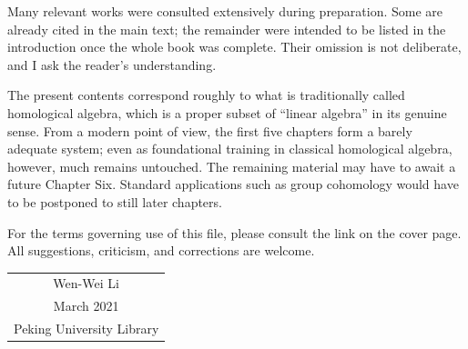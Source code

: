 Many relevant works were consulted extensively during preparation. Some are
already cited in the main text; the remainder were intended to be listed in
the introduction once the whole book was complete. Their omission is not
deliberate, and I ask the reader's understanding.

The present contents correspond roughly to what is traditionally called
homological algebra, which is a proper subset of ``linear algebra'' in its
genuine sense. From a modern point of view, the first five chapters form a
barely adequate system; even as foundational training in classical homological
algebra, however, much remains untouched. The remaining material may have to
await a future Chapter Six. Standard applications such as group cohomology
would have to be postponed to still later chapters.

For the terms governing use of this file, please consult the link on the cover
page. All suggestions, criticism, and corrections are welcome.

\vspace{1em}
\begin{flushright}\begin{minipage}{0.3 \textwidth}
  \begin{tabular}{c}
    Wen-Wei Li \\
    March 2021 \\
    Peking University Library
  \end{tabular}
\end{minipage}\end{flushright}
